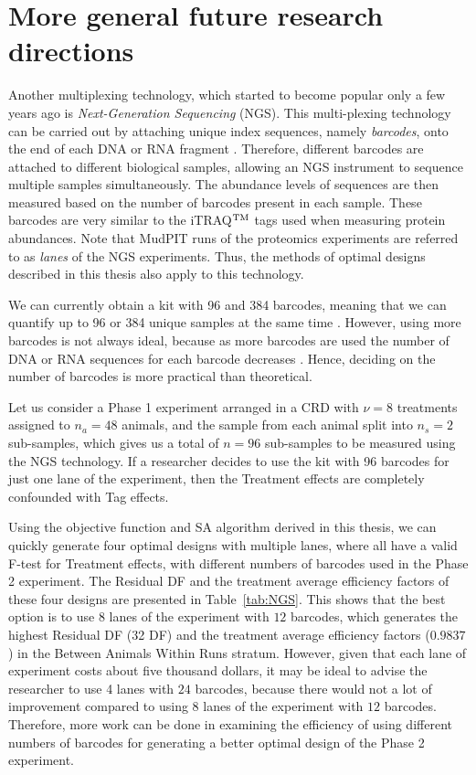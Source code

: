 \section{More general future research directions}
Another multiplexing technology, which started to become popular only a few years ago is \emph{Next-Generation Sequencing} (NGS). This multi-plexing technology can be carried out by attaching unique index sequences, namely \emph{barcodes}, onto the end of each DNA or RNA fragment \citep{smith2010}. Therefore, different barcodes are attached to different biological samples, allowing an NGS instrument to sequence multiple samples simultaneously. The abundance levels of sequences are then measured based on the number of barcodes present in each sample. These barcodes are very similar to the iTRAQ$^{\rm TM}$ tags used when measuring protein abundances. Note that MudPIT runs of the proteomics experiments are referred to as \emph{lanes} of the NGS experiments. Thus, the methods of optimal designs described in this thesis also apply to this technology. 

We can currently obtain a kit with 96 and 384 barcodes, meaning that we can quantify up to 96 or 384 unique samples at the same time \citep{smith2010, Shapland2015}. However, using more barcodes is not always ideal, because as more barcodes are used the number of DNA or RNA sequences for each barcode decreases \citep{campbell2015}. Hence, deciding on the number of barcodes is more practical than theoretical. 

Let us consider a Phase 1 experiment arranged in a CRD with $\nu = 8$ treatments assigned to $n_a = 48$ animals, and the sample from each animal split into $n_s = 2$ sub-samples, which gives us a total of $n = 96$ sub-samples to be measured using the NGS technology. If a researcher decides to use the kit with 96 barcodes for just one lane of the experiment, then the Treatment effects are completely confounded with Tag effects. 

Using the objective function and SA algorithm derived in this thesis, we can quickly generate four optimal designs with multiple lanes, where all have a valid F-test for Treatment effects, with different numbers of barcodes used in the Phase 2 experiment. The Residual DF and the treatment average efficiency factors of these four designs are presented in Table~\ref{tab:NGS}. This shows that the best option is to use $8$ lanes of the experiment with $12$ barcodes, which generates the highest Residual DF (32 DF) and the treatment average efficiency factors ($0.9837$) in the Between Animals Within Runs stratum. However, given that each lane of experiment costs about five thousand dollars, it may be ideal to advise the researcher to use 4 lanes with $24$ barcodes, because there would not a lot of improvement compared to using $8$ lanes of the experiment with $12$ barcodes. Therefore, more work can be done in examining the efficiency of using different numbers of barcodes for generating a better optimal design of the Phase 2 experiment.


